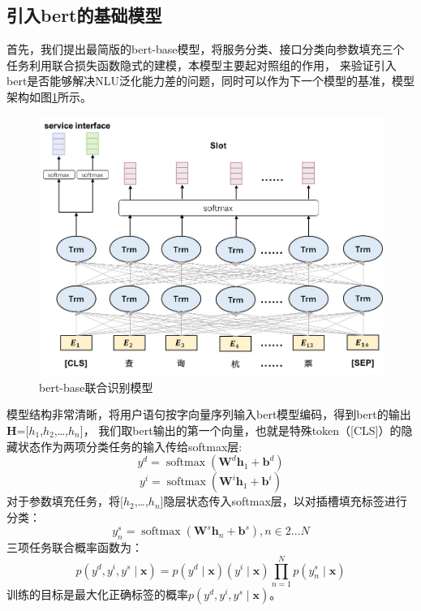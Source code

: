 \subsection{引入bert的基础模型}
首先，我们提出最简版的bert-base模型，将服务分类、接口分类向参数填充三个任务利用联合损失函数隐式的建模，本模型主要起对照组的作用，
来验证引入bert是否能够解决NLU泛化能力差的问题，同时可以作为下一个模型的基准，模型架构如图\ref{fig:bert-base}所示。

\begin{figure}[htbp]
  \centering
  \includegraphics[width=13cm]{./images/bert-base.jpg}
  \caption{bert-base联合识别模型}
  \label{fig:bert-base}
\end{figure}

模型结构非常清晰，将用户语句按字向量序列输入bert模型编码，得到bert的输出$\mathbf{H}$=[$h_{1}$,$h_{2}$,\dots,$h_{n}$]，
我们取bert输出的第一个向量，也就是特殊token（[CLS]）的隐藏状态作为两项分类任务的输入传给softmax层:
\begin{equation}
  y^{d}=\operatorname{softmax}\left(\mathbf{W}^{d} \boldsymbol{h}_{1}+\boldsymbol{b}^{d}\right)
\end{equation}
\begin{equation}
  y^{i}=\operatorname{softmax}\left(\mathbf{W}^{i} \boldsymbol{h}_{1}+\boldsymbol{b}^{i}\right)
\end{equation}
对于参数填充任务，将[$h_{2}$,\dots,$h_{n}$]隐层状态传入softmax层，以对插槽填充标签进行分类：
\begin{equation}
y_{n}^{s}=\operatorname{softmax}\left(\mathbf{W}^{s} \boldsymbol{h}_{n}+\boldsymbol{b}^{s}\right), n \in 2 \ldots N
\end{equation}
三项任务联合概率函数为：
\begin{equation}
  p\left(y^{d},y^{i}, y^{s} \mid \boldsymbol{x}\right)=p\left(y^{d} \mid \boldsymbol{x}\right) \left(y^{i} \mid \boldsymbol{x}\right) \prod_{n=1}^{N} p\left(y_{n}^{s} \mid \boldsymbol{x}\right)
  \end{equation}
  训练的目标是最大化正确标签的概率$p\left(y^{d},y^{i}, y^{s} \mid \boldsymbol{x}\right)$。

